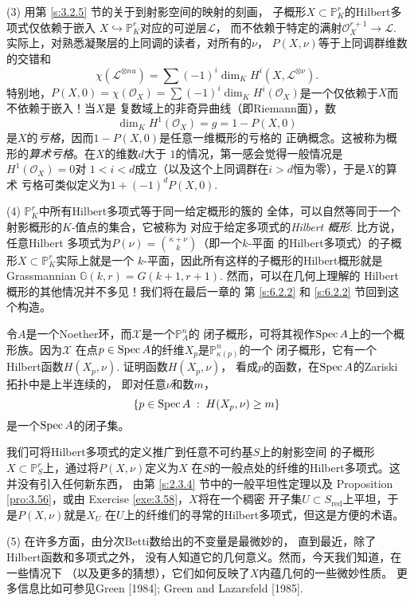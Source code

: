 (3) 用第 \ref{s:3.2.5} 节的关于到射影空间的映射的刻画，
子概形$X\subset \mathbb P_K^r$的Hilbert多项式仅依赖于嵌入
$X\hookrightarrow \mathbb P_K^r$对应的可逆层$\mathscr L$，
而不依赖于特定的满射$\mathscr O_X^{r+1}\to \mathscr L$. 
实际上，对熟悉凝聚层的上同调的读者，对所有的$\nu$，
$P(X,\nu)$等于上同调群维数的交错和
\[
  \chi(\mathscr L^{\otimes nu})=\sum (-1)^i \dim_K H^i
  (X,\mathscr L^{\otimes \nu}).
\]
特别地，$P(X,0)=\chi(\mathscr O_X)=\sum (-1)^i \dim_K
H^i(\mathscr O_X)$是一个仅依赖于$X$而不依赖于嵌入！当$X$是
复数域上的非奇异曲线（即Riemann面），数
\[
  \dim_K H^1(\mathscr O_X)=g=1-P(X,0)
\]
是$X$的\textit{亏格}，因而$1-P(X,0)$是任意一维概形的亏格的
正确概念。这被称为概形的\textit{算术亏格}。在$X$的维数$d$大于
$1$的情况，第一感会觉得一般情况是$H^1(\mathscr O_X)=0$对
$1< i < d$成立（以及这个上同调群在$i>d$恒为零），于是$X$的算术
亏格可类似定义为$1+(-1)^d P(X,0)$.

(4) $\mathbb P_K^r$中所有Hilbert多项式等于同一给定概形的簇的
全体，可以自然等同于一个射影概形的$K$-值点的集合，它被称为
对应于给定多项式的\textit{Hilbert 概形}. 比方说，任意Hilbert
多项式为$P(\nu)=\binom{\kappa+\nu}{k}$（即一个$k$-平面
的Hilbert多项式）的子概形$X\subset \mathbb P_K^r$实际上就是一个
$k$-平面，因此所有这样的子概形的Hilbert概形就是Grassmannian%
$\mathbb G(k,r)=G(k+1,r+1)$. 然而，可以在几何上理解的
Hilbert概形的其他情况并不多见！我们将在最后一章的
第 \ref{s:6.2.2} 和 \ref{s:6.2.2} 节回到这个构造。

\begin{exe}\label{exe:3.58}
令$A$是一个Noether环，而$\mathscr X$是一个$\mathbb P_A^n$的
闭子概形，可将其视作$\operatorname{Spec} A$上的一个概形族。因为$\mathscr X$
在点$p\in \operatorname{Spec} A$的纤维$X_p$是$\mathbb P_{\kappa(p)}^n$的一个
闭子概形，它有一个Hilbert函数$H(X_p,\nu)$. 证明函数$H(X_p,\nu)$，
看成$p$的函数，在$\operatorname{Spec} A$的Zariski拓扑中是上半连续的，
即对任意$\nu$和数$m$，
\[
	\{p\in \operatorname{Spec} A\;:\; H(X_p,\nu)\geq m\}
\]
是一个$\operatorname{Spec} A$的闭子集。
\end{exe}

我们可将Hilbert多项式的定义推广到任意不可约基$S$上的射影空间
的子概形$X\subset \mathbb P_S^r$上，通过将$P(X,\nu)$定义为$X$
在$S$的一般点处的纤维的Hilbert多项式。这并没有引入任何新东西，
由第 \ref{s:2.3.4} 节中的一般平坦性定理以及 Proposition 
\ref{pro:3.56}，或由 Exercise \ref{exe:3.58}，$X$将在一个稠密
开子集$U\subset S_{\text{red}}$上平坦，于是$P(X,\nu)$就是$X_U$
在$U$上的纤维们的寻常的Hilbert多项式，但这是方便的术语。

(5) 在许多方面，由分次Betti数给出的不变量是最微妙的，
直到最近，除了Hilbert函数和多项式之外，
没有人知道它的几何意义。然而，今天我们知道，在一些情况下
（以及更多的猜想），它们如何反映了$X$内蕴几何的一些微妙性质。
更多信息比如可参见Green [1984]; Green and Lazarsfeld [1985].

